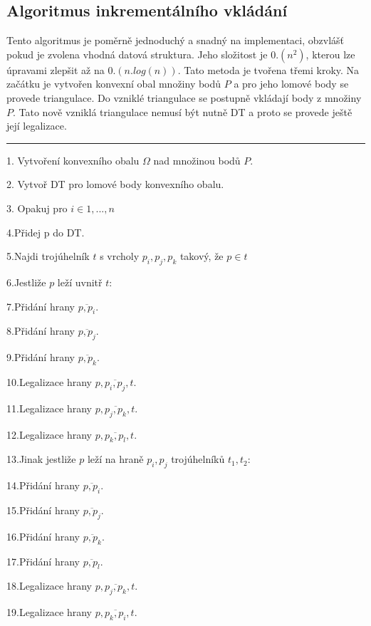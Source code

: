 \documentclass[12pt,a4paper]{article}
\begin{document}
\newpage
\subsection{Algoritmus inkrementálního vkládání}

Tento algoritmus je poměrně jednoduchý a snadný na implementaci, obzvlášť pokud je zvolena vhodná datová struktura. Jeho složitost je $0.(n^2)$, kterou lze úpravami zlepšit až na $0.(n.log(n))$. Tato metoda je tvořena třemi kroky. Na začátku je vytvořen konvexní obal množiny bodů $P$ a pro jeho lomové body se provede triangulace. Do vzniklé triangulace se postupně vkládají body z množiny $P$. Tato nově vzniklá triangulace nemusí být nutně DT a proto se provede ještě její legalizace.

\bigskip
\hrule
1.  Vytvoření konvexního obalu $\Omega$ nad množinou bodů $P$.

2.  Vytvoř DT pro lomové body konvexního obalu.

3.  Opakuj pro $i \in 1,...,n$

4.\indent  Přidej p do DT.

5.\indent  Najdi trojúhelník $t$ s vrcholy $p_i, p_j, p_k$ takový, že $p \in t$

6.\indent  Jestliže $p$ leží uvnitř $t$:

7.\indent \indent Přidání hrany $\overline{p,p_i}$.

8.\indent \indent Přidání hrany $\overline{p,p_j}$.

9.\indent \indent Přidání hrany $\overline{p,p_k}$.

10.\indent \indent Legalizace hrany $p,\overline{p_i,p_j},t$.

11.\indent \indent Legalizace hrany $p,\overline{p_j,p_k},t$.

12.\indent \indent Legalizace hrany $p,\overline{p_k,p_l},t$.

13.\indent Jinak jestliže $p$ leží na hraně $p_i, p_j$ trojúhelníků $t_1, t_2$:

14.\indent \indent Přidání hrany $\overline{p,p_i}$.

15.\indent \indent Přidání hrany $\overline{p,p_j}$.

16.\indent \indent Přidání hrany $\overline{p,p_k}$.

17.\indent \indent Přidání hrany $\overline{p,p_l}$.

18.\indent \indent Legalizace hrany $p,\overline{p_j,p_k},t$.

19.\indent \indent Legalizace hrany $p,\overline{p_k,p_i},t$.
\end{document}
